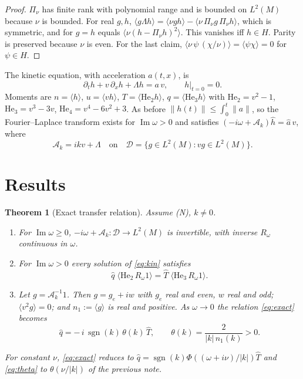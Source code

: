 \documentclass[11pt]{article}
\newcommand{\sgn}{\operatorname{sgn}}
\newcommand{\He}{\mathrm{He}}
\newcommand{\cA}{\mathcal{A}}
\newcommand{\avg}[1]{\langle #1\rangle}
\renewcommand{\Im}{\operatorname{Im}}
\newtheorem{theorem}{Theorem}
\theoremstyle{remark}
\begin{document}
\begin{proof}
$\Pi_\nu$ has finite rank with polynomial range and is bounded on $L^2(M)$
because $\nu$ is bounded. For real $g,h$,
$\avg{g\Lambda h} = \avg{\nu gh} - \avg{\nu\,\Pi_\nu g\,\Pi_\nu h}$, which is
symmetric, and for $g=h$ equals $\avg{\nu(h-\Pi_\nu h)^2}$. This vanishes iff
$h\in H$. Parity is preserved because $\nu$ is even. For the last claim,
$\avg{\nu\,\psi\,(\chi/\nu)} = \avg{\psi\chi} = 0$ for $\psi\in H$.
\end{proof}

The kinetic equation, with acceleration $a(t,x)$, is
\begin{equation}
  \partial_th + v\,\partial_xh + \Lambda h = a\,v,\qquad h|_{t=0}=0 .
  \label{eq:kin}
\end{equation}
Moments are $n=\avg{h}$, $u=\avg{vh}$, $T=\avg{\He_2h}$, $q=\avg{\He_3h}$
with $\He_2 = v^2-1$, $\He_3 = v^3-3v$, $\He_4 = v^4-6v^2+3$. As before
$\|h(t)\|\le\int_0^t\|a\|$, so the Fourier--Laplace transform exists for
$\Im\omega>0$ and satisfies $(-i\omega+\cA_k)\hat h = \hat a\,v$, where
\begin{equation}
  \cA_k = ikv + \Lambda \quad\text{on}\quad
  \mathcal{D} = \{g\in L^2(M): vg\in L^2(M)\}.
\end{equation}

\section{Results}

\begin{theorem}[Exact transfer relation]\label{thm:exact}
Assume (N), $k\ne0$.
\begin{enumerate}
  \item[(i)] For $\Im\omega\ge0$, $-i\omega+\cA_k:\mathcal{D}\to L^2(M)$ is
    invertible, with inverse $R_\omega$ continuous in $\omega$.
  \item[(ii)] For $\Im\omega>0$ every solution of \eqref{eq:kin} satisfies
    \begin{equation}
      \hat q\;\avg{\He_2\,R_\omega1} = \hat T\;\avg{\He_3\,R_\omega1}.
      \label{eq:exact}
    \end{equation}
  \item[(iii)] Let $g = \cA_k^{-1}1$. Then $g = g_e + iw$ with $g_e$ real
    and even, $w$ real and odd; $\avg{v^2g}=0$; and
    $n_1 := \avg{g}$ is real and positive. As $\omega\to0$ the relation
    \eqref{eq:exact} becomes
    \begin{equation}
      \hat q = -\,i\,\sgn(k)\,\theta(k)\,\hat T,\qquad
      \theta(k) = \frac{2}{|k|\,n_1(k)} > 0 .
      \label{eq:theta}
    \end{equation}
\end{enumerate}
For constant $\nu$, \eqref{eq:exact} reduces to
$\hat q = \sgn(k)\Phi((\omega+i\nu)/|k|)\hat T$ and \eqref{eq:theta} to
$\theta(\nu/|k|)$ of the previous note.
\end{theorem}
\end{document}
